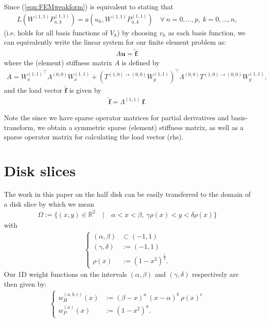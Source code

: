 \documentclass[11pt, oneside]{article}   	%
\newcommand{\half}{\frac{1}{2}}
\newcommand{\R}{\mathbb{R}}
\newcommand{\Wii}{W^{(1,1)}}
\newcommand{\Pii}{P^{(1,1)}}
\begin{document}
Since (\ref{eqn:FEMweakform}) is equivalent to stating that
\begin{align}
	L(\Wii \Pii_{n,k}) = a(u_h,\Wii \Pii_{n,k}) \quad \forall \: n = 0,\dots,p, \: k = 0,\dots,n,
\end{align}
(i.e. holds for all basis functions of $V_h$) by choosing $v_h$ as each basis function, we can equivalently write the linear system for our finite element problem as:
\begin{align}
A\mathbf{u} = \tilde{\mathbf{f}}.
\end{align}
where the (element) stiffness matrix $A$ is defined by 
\begin{align}
A = {\Wii_x}^\top \Lambda^{(0,0)} \Wii_x + ({T^{(1,0)\to(0,0)} \Wii_y})^\top \Lambda^{(0,0)} T^{(1,0)\to(0,0)} \Wii_y, 
\end{align}
and the load vector $\tilde{\mathbf{f}}$ is given by 
\begin{align}
\tilde{\mathbf{f}} = \Lambda^{(1,1)} \: \mathbf{f}.
\end{align}

Note the since we have sparse operator matrices for partial derivatives and basis-transform, we obtain a symmetric sparse (element) stiffness matrix, as well as a sparse operator matrix for calculating the load vector (rhs).

\section{Disk slices}

The work in this paper on the half disk can be easily transferred to the domain of a disk slice by which we mean
\begin{align}
	\Omega := \{(x,y) \in \R^2 \quad | \quad \alpha < x < \beta, \: \gamma \rho(x) < y < \delta \rho(x)\}
\end{align}
with 
\begin{align}
\begin{cases}
(\alpha, \beta) &\subset (-1,1) \\
(\gamma, \delta) &:= (-1,1) \\
\rho(x) &:= (1-x^2)^{\half}.
\end{cases}
\end{align}
Our 1D weight functions on the intervals $(\alpha, \beta)$ and $(\gamma, \delta)$ respectively are then given by:
\begin{align}
\begin{cases}
w^{(a,b,c)}_H(x) &:= (\beta - x)^a \: (x - \alpha)^{b} \: \rho(x)^{c} \\
w^{(a)}_P(x) &:= (1-x^2)^a.
\end{cases}
\end{align}
\end{document}
